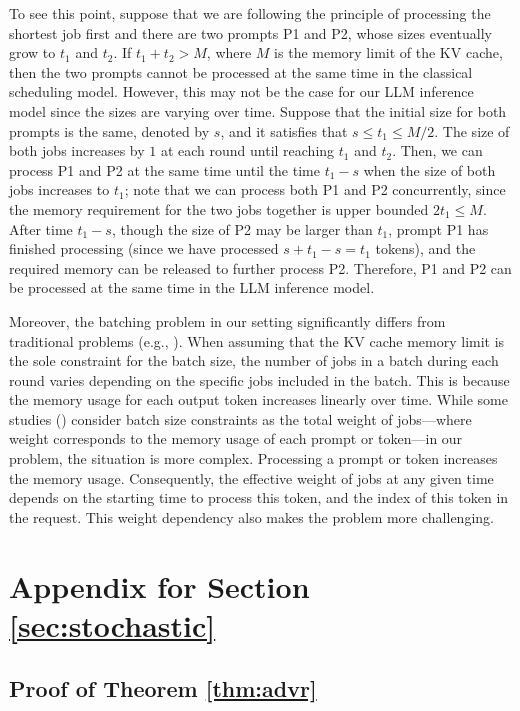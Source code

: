 \documentclass[11pt, a4paper]{article}
\theoremstyle{plain}
\theoremstyle{definition}
\theoremstyle{remark}
\begin{document}
To see this point, suppose that we are following the principle of processing the shortest job first and there are two prompts P1 and P2, whose sizes eventually grow to $t_1$ and $t_2$. If $t_1+t_2>M$, where $M$ is the memory limit of the KV cache, then the two prompts cannot be processed at the same time in the classical scheduling model. However, this may not be the case for our LLM inference model since the sizes are varying over time. Suppose that the initial size for both prompts is the same, denoted by $s$, and it satisfies that $s\leq t_1 \leq M/2$. The size of both jobs increases by $1$ at each round until reaching $t_1$ and $t_2$. Then, we can process P1 and P2 at the same time until the time $t_1-s$ when the size of both jobs increases to $t_1$; note that we can process both P1 and P2 concurrently, since the memory requirement for the two jobs together is upper bounded $2t_1\leq M$. After time $t_1-s$, though the size of P2 may be larger than $t_1$, prompt P1 has finished processing (since we have processed $s + t_1 - s = t_1$ tokens), and the required memory can be released to further process P2. Therefore, P1 and P2 can be processed at the same time in the LLM inference model. 

Moreover, the batching problem in our setting significantly differs from traditional problems (e.g., \cite{potts2000scheduling}). When assuming that the KV cache memory limit is the sole constraint for the batch size, the number of jobs in a batch during each round varies depending on the specific jobs included in the batch. This is because the memory usage for each output token increases linearly over time. While some studies (\cite{kashan2008scheduling,hazir2014batch,yang2022scheduling}) consider batch size constraints as the total weight of jobs—where weight corresponds to the memory usage of each prompt or token—in our problem, the situation is more complex. Processing a prompt or token increases the memory usage. Consequently, the effective weight of jobs at any given time depends on the starting time to process this token, and the index of this token in the request. This weight dependency also makes the problem more challenging.





\section{Appendix for Section \ref{sec:stochastic}} \label{app:sto}


\subsection{Proof of Theorem \ref{thm:advr}}
\end{document}
